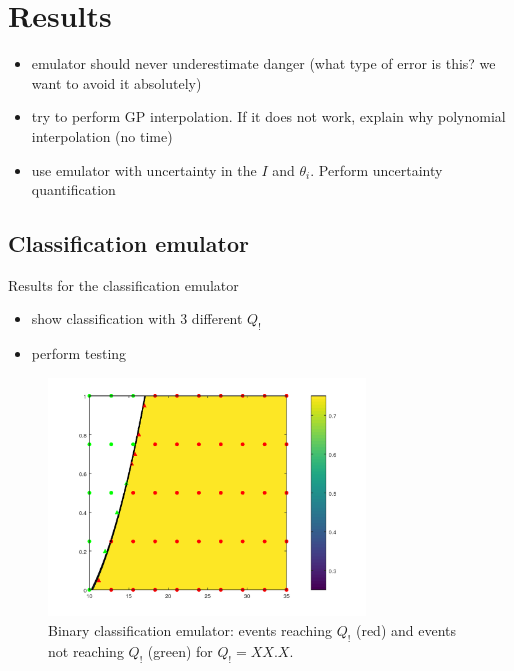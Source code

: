 \chapter{Results}
\label{chp:results}


\begin{itemize}
\itemsep0em
  \item emulator should never underestimate danger (what type of error is this? we want to avoid it absolutely)
  \item try to perform GP interpolation. If it does not work, explain why polynomial interpolation (no time)
  \item use emulator with uncertainty in the $I$ and $\theta_i$. Perform uncertainty quantification
\end{itemize}

\section{Classification emulator}

Results for the classification emulator
\begin{itemize}
  \item show classification with 3 different $Q_!$
  \item perform testing 
\end{itemize}

\begin{figure}[htpb]
  \centering
  \includegraphics[width=0.75\textwidth]{Figures/classification.png}
  \caption{Binary classification emulator: events reaching $Q_!$ (red) and events not reaching $Q_!$ (green) for $Q_! = XX.X$.}
  \label{fig:classification_Q1}
\end{figure}

